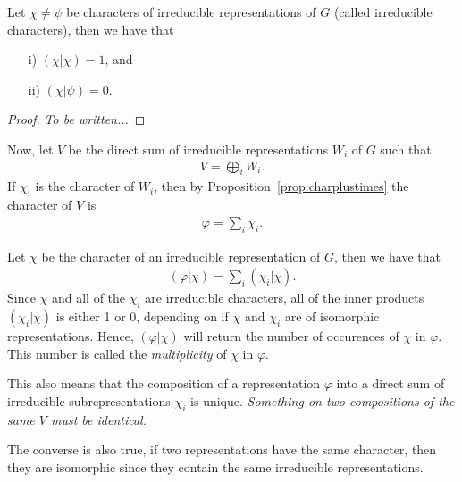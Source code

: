 \begin{theorem}\label{thm:irredcrit}
	Let $\chi \neq \psi$ be characters of irreducible representations of $G$ (called irreducible characters), then we have that 
	\begin{enumerate}
		\item[i)] $(\chi|\chi)= 1$, and
		\item[ii)] $(\chi|\psi) = 0$.
	\end{enumerate}
\end{theorem}
\begin{proof}
	\textit{To be written...}
\end{proof}

Now, let $V$ be the direct sum of irreducible representations $W_i$ of $G$ such that
\begin{align*}
	V = \bigoplus_i W_i.
\end{align*}
If $\chi_i$ is the character of $W_i$, then by Proposition~\ref{prop:charplustimes} the character of $V$ is
\begin{align*}
	\varphi = \sum_i \chi_i.
\end{align*}

Let $\chi$ be the character of an irreducible representation of $G$, then we have that
\begin{align*}
	(\varphi|\chi) = \sum_i (\chi_i|\chi).
\end{align*}
Since $\chi$ and all of the $\chi_i$ are irreducible characters, all of the inner products $(\chi_i|\chi)$ is either 1 or 0, depending on if $\chi$ and $\chi_i$ are of isomorphic representations. Hence, $(\varphi|\chi)$ will return the number of occurences of $\chi$ in $\varphi$. This number is called the \textit{multiplicity} of $\chi$ in $\varphi$.

\begin{remark}
	This also means that the composition of a representation $\varphi$ into a direct sum of irreducible subrepresentations $\chi_i$ is unique. \textit{Something on two compositions of the same $V$ must be identical.}
\end{remark}

\begin{remark}
	The converse is also true, if two representations have the same character, then they are isomorphic since they contain the same irreducible representations.
\end{remark}

